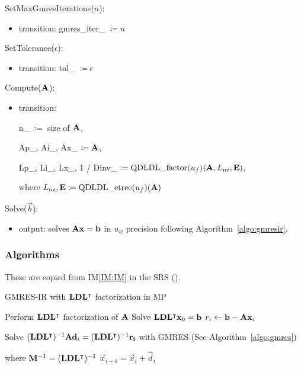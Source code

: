 \documentclass[12pt, titlepage]{article}
\newcommand{\iref}[1]{IM\ref{#1}}
\begin{document}
\noindent SetMaxGmresIterations(\(n\)):
\begin{itemize}
\item transition: gmres\_iter\_ \(\coloneq n\)
\end{itemize}

\noindent SetTolerance(\(\epsilon\)):
\begin{itemize}
\item transition: tol\_ \(\coloneq \epsilon\)
\end{itemize}

\noindent Compute(\(\mathbf{A}\)):
\begin{itemize}
\item transition: \par
  n\_ \(\coloneq\) size of \(\mathbf{A}\), \par
  Ap\_, Ai\_, Ax\_ \(\coloneq \mathbf{A}\), \par
  Lp\_, Li\_, Lx\_, 1 / Dinv\_ \(\coloneq \text{QDLDL\_factor}(u_f)(\mathbf{A}, L_\mathrm{nz}, \mathbf{E})\), \par
  where \(L_\mathrm{nz}, \mathbf{E} \coloneq \text{QDLDL\_etree}(u_f)(\mathbf{A})\)

\end{itemize}

\noindent Solve(\(\vec{b}\)):
\begin{itemize}
\item output: solves \(\mathbf{A}\mathbf{x} = \mathbf{b} \) in \(u_w\) precision following
  Algorithm~\ref{algo:gmresir}.
\end{itemize}

\subsubsection{Algorithms}

These are copied from \iref{IM:IM} in the SRS (\cite{SRS}).
\begin{algorithm}[H]
  \caption{GMRES-IR with \(\mathbf{L}\mathbf{D}\mathbf{L}^\intercal\) factorization in MP}
  \label{algo:gmresir}
  \begin{algorithmic}[1]
    \State Perform \(\mathbf{L}\mathbf{D}\mathbf{L}^\intercal\) factorization of \(\mathbf{A}\) 
    \State Solve \(\mathbf{L}\mathbf{D}\mathbf{L}^\intercal \mathbf{x}_0 = \mathbf{b}\) 
      \State \(r_i \gets \mathbf{b} - \mathbf{A}\mathbf{x}_i\) 

      \State Solve \((\mathbf{L}\mathbf{D}\mathbf{L}^\intercal)^{-1}\mathbf{A}\mathbf{d}_i =
      (\mathbf{L}\mathbf{D}\mathbf{L}^\intercal)^{-1}\mathbf{r_i}\) with GMRES (See
      Algorithm~\ref{algo:gmres}) \par
      where \(\mathbf{M}^{-1} = (\mathbf{L}\mathbf{D}\mathbf{L}^\intercal)^{-1}\) 
      \State \(\vec{x}_{i + 1} = \vec{x}_i + \vec{d}_i\) 
    \EndFor
  \end{algorithmic}
\end{algorithm}
\end{document}
